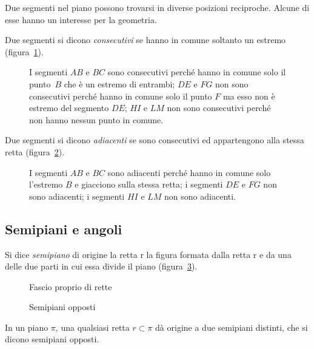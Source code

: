 {Due segmenti nel piano possono trovarsi in diverse posizioni reciproche. Alcune di esse hanno un interesse per la geometria.
\begin{definizione}
Due segmenti si dicono \emph{consecutivi} se hanno in comune soltanto un estremo (figura~\ref{fig:1.14}).
\end{definizione}
\begin{figure}[b,t,h]
 \centering 
 \caption{I segmenti $ AB $ e $ BC $ sono consecutivi perché hanno in comune solo il punto~$ B $ che è un estremo di entrambi; $ DE $ e $ FG $ non sono consecutivi perché hanno in comune solo il punto $ F $ ma esso non è estremo del segmento $ DE $; $ HI $ e $ LM $ non sono consecutivi perché non hanno nessun punto in comune.}\label{fig:1.14}
\end{figure}

\begin{definizione}
Due segmenti si dicono \emph{adiacenti} se sono consecutivi ed appartengono alla stessa retta (figura~\ref{fig:1.15}).
\end{definizione}
\begin{figure}[t,b,h]
 \centering 
 \caption{I segmenti $ AB $ e $ BC $ sono adiacenti perché hanno in comune solo l'estremo $ B $ e giacciono sulla stessa retta; i segmenti $ DE $ e $ FG $ non sono adiacenti; i segmenti $ HI $ e $ LM $ non sono adiacenti.}\label{fig:1.15}
\end{figure}

\subsection{Semipiani e angoli}

\begin{definizione}
Si dice \emph{semipiano} di origine la retta r la figura formata dalla retta r e da una delle due parti in cui essa divide il piano (figura~\ref{fig:1.17}).
\end{definizione}
\begin{figure}[b,t,h]
 \begin{minipage}[b]{.40\textwidth}
 \centering
 \caption{Fascio proprio di rette}\label{fig:1.16}
 \end{minipage}\hfil
 \begin{minipage}[b]{.40\textwidth}
 \centering
  \caption{Semipiani opposti}\label{fig:1.17}
  \end{minipage}
\end{figure}
In un piano ${\pi}$, una qualsiasi retta $r \subset \pi$ dà origine a due semipiani distinti, che si dicono semipiani opposti.

}

